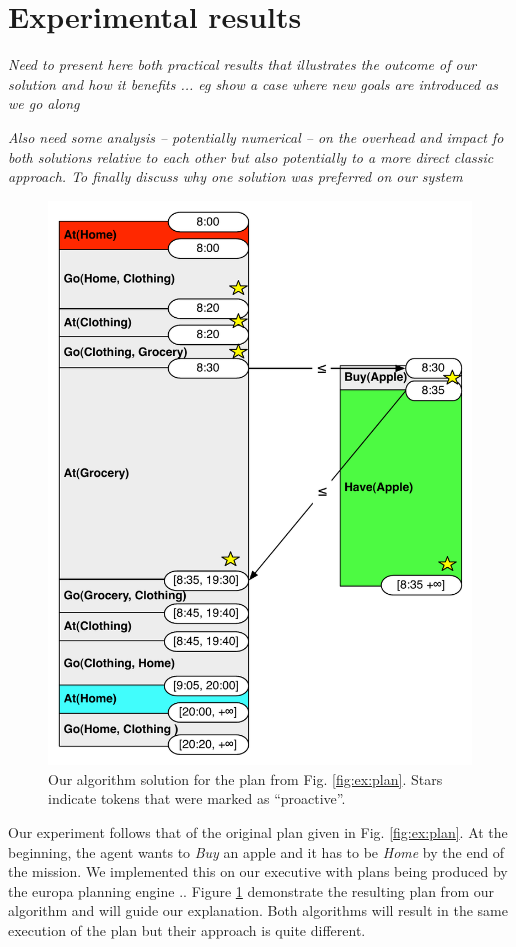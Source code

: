 
\section{Experimental results}
\label{sec:exp}

{\em\color{gray} Need to present here both practical results that illustrates the outcome of our solution and how it benefits ... eg show a case where new goals are introduced as we go along}

{\em\color{gray} Also need some analysis -- potentially numerical -- on the overhead and impact fo both solutions relative to each other but also potentially to a more direct classic approach. 
To finally discuss why one solution was preferred on our system} 

\begin{figure}
  \centering
  \includegraphics[width=0.8\columnwidth]{figs/example_MixedInitial}
  \caption{Our algorithm solution for the plan from
    Fig. \ref{fig:ex:plan}. Stars indicate tokens that were marked
  as ``proactive''.}
  \label{fig:ex:mixed1}
\end{figure}

Our experiment follows that of the original plan given in
Fig. \ref{fig:ex:plan}. At the beginning, the agent wants to {\em Buy}
an apple and it has to be {\em Home} by the end of the mission. We
implemented this on our executive with plans being produced by the
europa planning engine \cite{frank2003}.. Figure \ref{fig:ex:mixed1}
demonstrate the resulting plan from our algorithm and will guide our
explanation. Both algorithms will result in the same execution of the
plan but their approach is quite different.

